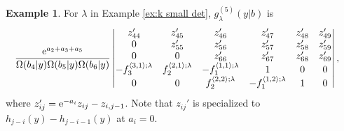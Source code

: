 \documentclass[pdftex]{sigma}
\numberwithin{equation}{section}
\newcommand{\la}{\lambda}
\theoremstyle{definition}
\newtheorem{Example}[Theorem]{Example}
\begin{document}
\begin{Example}\label{eq:n6_7boxes} For $\la$ in Example
 \ref{ex:k small det}, $g^{(5)}_{\lambda}(y|b)$ is
\[
\begin{aligned}
&
\dfrac{{\rm e}^{a_2+a_3+a_5}}
{\Omega(b_4|y)\Omega(b_5|y)\Omega(b_6|y)}
\begin{vmatrix}
 z'_{44}&z'_{45}&z'_{46}&z'_{47}&z'_{48}&z'_{49}\\
 0&z'_{55}&z'_{56}&z'_{57}&z'_{58}&z'_{59}\\
 0&0&z'_{66}&z'_{67}&z'_{68}&z'_{69}\\
 -f_3^{\langle 3,1\rangle;\la} & f_2^{\langle 2,1\rangle;\la} & -f_1^{\langle 1,1 \rangle;\la} & 1 & 0 & 0\\
 0&0&f_2^{\langle 2,2\rangle;\la}&-f_1^{\langle 1,2 \rangle;\la} & 1 &0
\end{vmatrix},
\end{aligned}
\]
where
$z'_{ij}={\rm e}^{-a_i}z_{ij}-z_{i,j-1}$.
Note that
$z_{ij}'
$ is specialized to
$h_{j-i}(y)-h_{j-i-1}(y)$
at $a_i=0$.
\end{Example}
\end{document}
